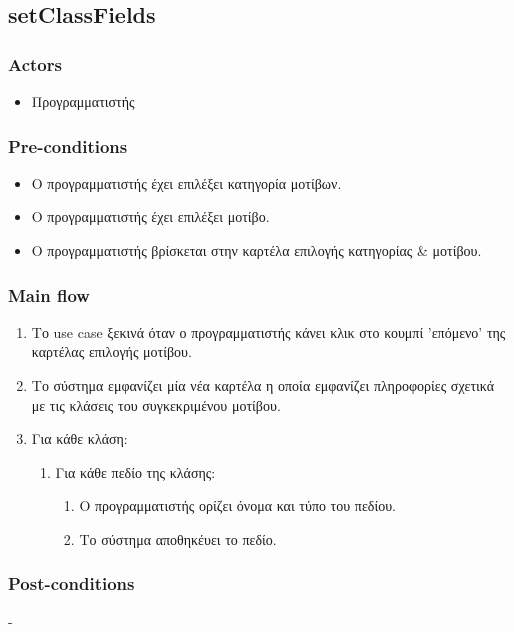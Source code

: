 \documentclass[../diploma_thesis.tex]{subfiles}
\begin{document}
\subsection{setClassFields}
\subsubsection{Actors}
\begin{itemize}
\item  Προγραμματιστής
\end{itemize}
\subsubsection{Pre-conditions}
\begin{itemize}
\item Ο προγραμματιστής έχει επιλέξει κατηγορία μοτίβων.
\item  Ο προγραμματιστής έχει επιλέξει μοτίβο.
\item Ο προγραμματιστής βρίσκεται στην καρτέλα επιλογής κατηγορίας \& μοτίβου.
\end{itemize}
\subsubsection{Main flow}
\begin{enumerate}
\item Το use case ξεκινά όταν ο προγραμματιστής κάνει κλικ στο κουμπί 'επόμενο' της καρτέλας επιλογής μοτίβου.
\item Το σύστημα εμφανίζει μία νέα καρτέλα η οποία εμφανίζει πληροφορίες σχετικά με τις κλάσεις του συγκεκριμένου μοτίβου.
\item Για κάθε κλάση:\begin{enumerate}
\item Για κάθε πεδίο της κλάσης:\begin{enumerate}
\item Ο προγραμματιστής ορίζει όνομα και τύπο του πεδίου.
\item Το σύστημα αποθηκέυει το πεδίο.
\end{enumerate}
\end{enumerate}
\end{enumerate}
\subsubsection{Post-conditions}
-
\end{document}
